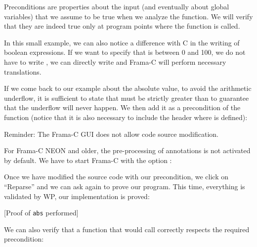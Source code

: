 Preconditions are properties about the input (and eventually about
global variables) that we assume to be true when we analyze the
function. We will verify that they are indeed true only at program
points where the function is called.



In this small example, we can also notice a difference with C in the
writing of boolean expressions. If we want to specify that  is
between 0 and 100, we do not have to write ,
we can directly write  and Frama-C will
perform necessary translations.



If we come back to our example about the absolute value, to avoid the
arithmetic underflow, it is sufficient to state that  must
be strictly greater than  to guarantee that the
underflow will never happen. We then add it as a precondition of the
function (notice that it is also necessary to include the header where
 is defined):






\begin{Warning}
  Reminder: The Frama-C GUI does not allow code source modification.
\end{Warning}


\begin{Information}
  For Frama-C NEON and older, the
  pre-processing of annotations is not activated by default. We
  have to start Frama-C with the option :

\end{Information}


Once we have modified the source code with our precondition, we click on
``Reparse'' and we can ask again to prove our program. This time,
everything is validated by WP, our implementation is proved:



[Proof of \texttt{abs} performed]


We can also verify that a function that would call 
correctly respects the required precondition:



